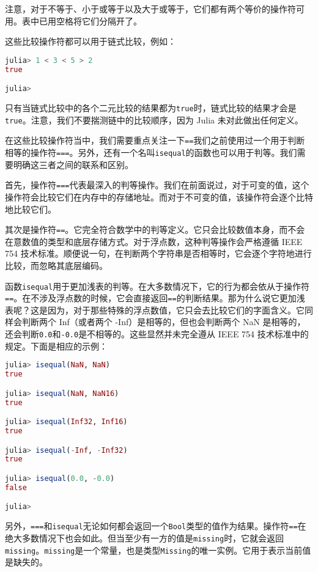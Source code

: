 注意，对于不等于、小于或等于以及大于或等于，它们都有两个等价的操作符可用。表中已用空格将它们分隔开了。

这些比较操作符都可以用于链式比较，例如：
\begin{lstlisting}[language=julia]
julia> 1 < 3 < 5 > 2
true

julia> 
\end{lstlisting}

只有当链式比较中的各个二元比较的结果都为\verb`true`时，链式比较的结果才会是\verb`true`。注意，我们不要揣测链中的比较顺序，因为 Julia 未对此做出任何定义。

在这些比较操作符当中，我们需要重点关注一下\verb`==`我们之前使用过一个用于判断相等的操作符\verb`===`。另外，还有一个名叫\verb`isequal`的函数也可以用于判等。我们需要明确这三者之间的联系和区别。

首先，操作符\verb`===`代表最深入的判等操作。我们在前面说过，对于可变的值，这个操作符会比较它们在内存中的存储地址。而对于不可变的值，该操作符会逐个比特地比较它们。

其次是操作符\verb`==`。它完全符合数学中的判等定义。它只会比较数值本身，而不会在意数值的类型和底层存储方式。对于浮点数，这种判等操作会严格遵循 IEEE 754 技术标准。顺便说一句，在判断两个字符串是否相等时，它会逐个字符地进行比较，而忽略其底层编码。

函数\verb`isequal`用于更加浅表的判等。在大多数情况下，它的行为都会依从于操作符\verb`==`。在不涉及浮点数的时候，它会直接返回\verb`==`的判断结果。那为什么说它更加浅表呢？这是因为，对于那些特殊的浮点数值，它只会去比较它们的字面含义。它同样会判断两个 Inf（或者两个 -Inf）是相等的，但也会判断两个 NaN 是相等的，还会判断\verb`0.0`和\verb`-0.0`是不相等的。这些显然并未完全遵从 IEEE 754 技术标准中的规定。下面是相应的示例：
\begin{lstlisting}[language=julia]
julia> isequal(NaN, NaN)
true

julia> isequal(NaN, NaN16)
true

julia> isequal(Inf32, Inf16)
true

julia> isequal(-Inf, -Inf32)
true

julia> isequal(0.0, -0.0)
false

julia> 
\end{lstlisting}

另外，\verb`===`和\verb`isequal`无论如何都会返回一个\verb`Bool`类型的值作为结果。操作符\verb`==`在绝大多数情况下也会如此。但当至少有一方的值是\verb`missing`时，它就会返回\verb`missing`。\verb`missing`是一个常量，也是类型\verb`Missing`的唯一实例。它用于表示当前值是缺失的。

